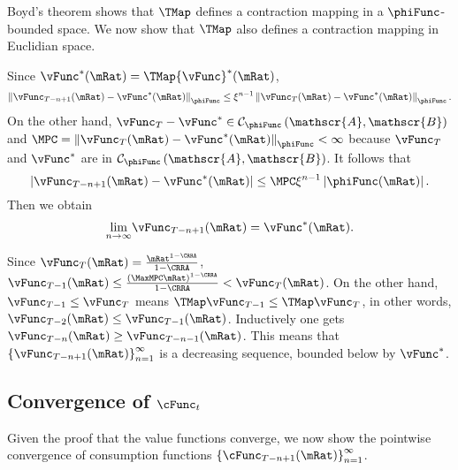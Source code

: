 \documentclass[titlepage]{\econtex}\providecommand{\texname}{BufferStockTheory}%
\begin{document}
Boyd's theorem shows that $\TMap$ defines a contraction mapping
in a $\phiFunc$-bounded space. We now show that $\TMap$ also
defines a contraction mapping in Euclidian space.

Since $\vFunc^{\ast }(\mRat)=\TMap {\vFunc}^{\ast }(\mRat)$,
\begin{equation}
\left\Vert \vFunc_{T-n+1}(\mRat)-\vFunc^{\ast }(\mRat)\right\Vert _{\phiFunc }\leq \xi
^{n-1}\left\Vert \vFunc_{T}(\mRat)-\vFunc^{\ast }(\mRat)\right\Vert _{\phiFunc }.
\end{equation}%
On the other hand, $\vFunc_{T}-\vFunc^{\ast }\in \mathcal{C}_{\phiFunc }\left( \mathscr{A},
\mathscr{B}\right) $ and $\MPC =\left\Vert \vFunc_{T}(\mRat)-\vFunc^{\ast }(\mRat)\right\Vert_{\phiFunc }<\infty $ because $\vFunc_{T}$ and $\vFunc^{\ast }$ are in $\mathcal{C}_{\phiFunc
}\left( \mathscr{A},\mathscr{B}\right) $. It follows that%
\begin{equation}
\left\vert \vFunc_{T-n+1}(\mRat)-\vFunc^{\ast }(\mRat)\right\vert \leq \MPC \xi
^{n-1}\left\vert \phiFunc(\mRat)\right\vert.
\end{equation}%
Then we obtain
\begin{equation}
\underset{n\rightarrow \infty }{\lim }\vFunc_{T-n+1}(\mRat)=\vFunc^{\ast }(\mRat).
\end{equation}

Since $\vFunc_{T}(\mRat)=\frac{\mRat^{1-\CRRA }}{1-\CRRA }$, $\vFunc_{T-1}(\mRat)\leq \frac{\left(\MaxMPC \mRat\right)^{1-\CRRA}}{1-\CRRA}<\vFunc_{T}(\mRat)$. On the other hand, $\vFunc_{T-1}\leq \vFunc_{T}$
means $\TMap\vFunc_{T-1}\leq \TMap\vFunc_{T}$, in other words, $\vFunc_{T-2}(\mRat)\leq \vFunc_{T-1}(\mRat)$.
Inductively one gets $\vFunc_{T-n}(\mRat)\geq \vFunc_{T-n-1}(\mRat)$. This means that $\left\{
\vFunc_{T-n+1}(\mRat)\right\} _{n=1}^{\infty }$ is a decreasing sequence,
bounded below by $\vFunc^{\ast}$.


\subsection{Convergence of $\cFunc_{t}$}\label{sec:cConverges}\label{sec:cEuclidian}

Given the proof that the value functions converge, we now show the
pointwise convergence of consumption functions
$\left\{\cFunc_{T-n+1}(\mRat)\right\} _{n=1}^{\infty }$.
\end{document}
